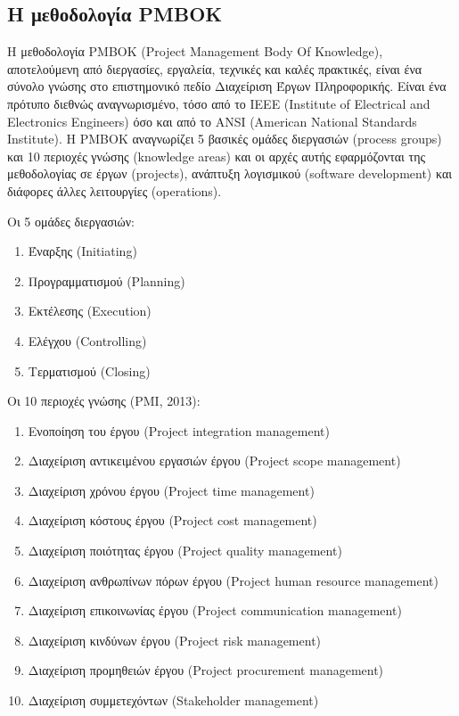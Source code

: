\documentclass[12pt]{turabian-researchpaper}
\begin{document}
\subsection{Η μεθοδολογία PMBOK}\label{method_pmbok}
Η μεθοδολογία PMBOK (Project Management Body Οf Knowledge), αποτελούμενη από διεργασίες, εργαλεία, τεχνικές και καλές πρακτικές, είναι ένα σύνολο γνώσης στο επιστημονικό πεδίο Διαχείριση Έργων Πληροφορικής. Είναι ένα πρότυπο διεθνώς αναγνωρισμένο, τόσο από το IEEE (Institute of Electrical and Electronics Engineers) όσο και από το ANSI (American National Standards Institute). Η PMBOK αναγνωρίζει 5 βασικές ομάδες διεργασιών (process groups) και 10 περιοχές γνώσης (knowledge areas) και οι αρχές αυτής εφαρμόζονται της μεθοδολογίας σε έργων (projects), ανάπτυξη λογισμικού (software development) και διάφορες άλλες λειτουργίες (operations). \par
{\parindent0pt
    Οι 5 ομάδες διεργασιών:
    \begin{enumerate}[itemsep=0pt]
        \item Έναρξης (Initiating)
        \item Προγραμματισμού (Planning)
        \item Εκτέλεσης (Execution)
        \item Ελέγχου (Controlling)
        \item Τερματισμού (Closing)
    \end{enumerate}
    Οι 10 περιοχές γνώσης (PMI, 2013):
    \begin{enumerate}[itemsep=0pt]
        \item Ενοποίηση του έργου (Project integration management)
        \item Διαχείριση αντικειμένου εργασιών έργου (Project scope management)
        \item Διαχείριση χρόνου έργου (Project time management)
        \item Διαχείριση κόστους έργου (Project cost management)
        \item Διαχείριση ποιότητας έργου (Project quality management)
        \item Διαχείριση ανθρωπίνων πόρων έργου (Project human resource management)
        \item Διαχείριση επικοινωνίας έργου (Project communication management)
        \item Διαχείριση κινδύνων έργου (Project risk management)
        \item Διαχείριση προμηθειών έργου (Project procurement management)
        \item Διαχείριση συμμετεχόντων (Stakeholder management)
    \end{enumerate}
}
\end{document}
